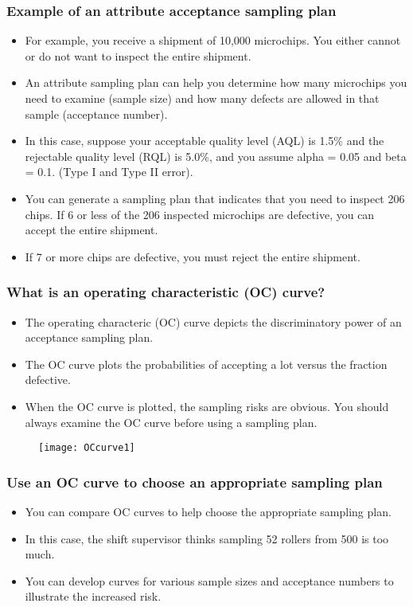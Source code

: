 \documentclass{beamer}
\begin{document}
\begin{frame}
	\frametitle{Example of an attribute acceptance sampling plan}
	\begin{itemize}
		\item 
		For example, you receive a shipment of 10,000 microchips. You either cannot or do not want to inspect the entire shipment.
		\item An attribute sampling plan can help you determine how many microchips you need to examine (sample size) and how many defects are allowed in that sample (acceptance number).
		\item 
		In this case, suppose your acceptable quality level (AQL) is 1.5\% and the rejectable quality level (RQL) is 5.0\%, and you assume alpha = 0.05 and beta = 0.1. (Type I and Type II error).
		\item You can generate a sampling plan that indicates that you need to inspect 206 chips. If 6 or less of the 206 inspected microchips are defective, you can accept the entire shipment. 
		\item 
		If 7 or more chips are defective, you must reject the entire shipment.
	\end{itemize}
\end{frame}
\begin{frame}
	
	\frametitle{What is an operating characteristic (OC) curve?}
	
	\begin{itemize}
		\item The operating characteric (OC) curve depicts the discriminatory power of an acceptance sampling plan. 
		\item The OC curve plots the probabilities of accepting a lot versus the fraction defective.
		\item 
		When the OC curve is plotted, the sampling risks are obvious. You should always examine the OC curve before using a sampling plan.
	\end{itemize}
\end{frame}
\begin{frame}
	\begin{figure}
\centering
\texttt{[image: OCcurve1]}
\end{figure}

\end{frame}
\begin{frame}
	
	
	\frametitle{Use an OC curve to choose an appropriate sampling plan}
	
	\begin{itemize}
		\item You can compare OC curves to help choose the appropriate sampling plan. 
		\item In this case, the shift supervisor thinks sampling 52 rollers from 500 is too much. 
		\item You can develop curves for various sample sizes and acceptance numbers to illustrate the increased risk.
	\end{itemize}
\end{frame}
\end{document}
